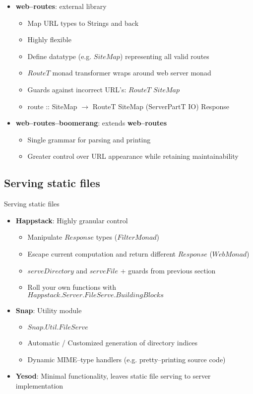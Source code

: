 \documentclass[10pt,usenames,dvipsnames]{beamer}
\begin{document}
	\begin{frame}
		\begin{itemize}
		\item \textbf{web--routes}: external library
		\begin{itemize}
			\item Map URL types to Strings and back
			\item Highly flexible
			\item Define datatype (e.g. $ SiteMap $) representing all valid routes
			\item $ RouteT $ monad transformer wraps around web server monad
			\item Guards against incorrect URL's: $ RouteT $ $ SiteMap $
			\item route :: SiteMap $ \rightarrow $ RouteT SiteMap (ServerPartT IO) Response
		\end{itemize}
		\item \textbf{web--routes--boomerang}: extends \textbf{web--routes}
		\begin{itemize}
			\item Single grammar for parsing and printing
			\item Greater control over URL appearance while retaining maintainability
		\end{itemize}
		\end{itemize}
	\end{frame}
	
	\subsection*{Serving static files}
	
	\begin{frame}{Serving static files}
		\begin{itemize}
		\item \textbf{Happstack}: Highly granular control
		\begin{itemize}
			\item Manipulate $ Response $ types ($ FilterMonad $)
			\item Escape current computation and return different $ Response $ ($ WebMonad $)
			\item $ serveDirectory $ and $ serveFile $ + guards from previous section
			\item Roll your own functions with $ Happstack.Server.FileServe.BuildingBlocks $
		\end{itemize}
		\item\textbf{Snap}: Utility module
		\begin{itemize}
			\item $ Snap.Util.FileServe $
			\item Automatic / Customized generation of directory indices
			\item Dynamic MIME--type handlers (e.g. pretty--printing source code)
		\end{itemize}
		\item \textbf{Yesod}: Minimal functionality, leaves static file serving to server implementation
		\end{itemize}
	\end{frame}	
	
\end{document}
